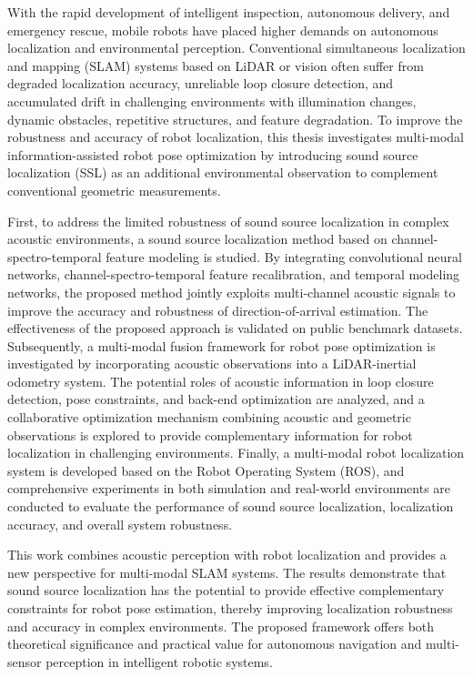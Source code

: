 \begin{abstract*}
With the rapid development of intelligent inspection, autonomous delivery, and 
emergency rescue, mobile robots have placed higher demands on autonomous 
localization and environmental perception. Conventional simultaneous localization 
and mapping (SLAM) systems based on LiDAR or vision often suffer from degraded 
localization accuracy, unreliable loop closure detection, and accumulated drift 
in challenging environments with illumination changes, dynamic obstacles, 
repetitive structures, and feature degradation. To improve the robustness and 
accuracy of robot localization, this thesis investigates multi-modal 
information-assisted robot pose optimization by introducing sound source 
localization (SSL) as an additional environmental observation to complement 
conventional geometric measurements.

First, to address the limited robustness of sound source localization in complex 
acoustic environments, a sound source localization method based on channel-spectro-temporal 
feature modeling is studied. By integrating convolutional neural networks, channel-spectro-temporal 
feature recalibration, and temporal modeling networks, the proposed method jointly exploits 
multi-channel acoustic signals to improve the accuracy and robustness of direction-of-arrival 
estimation. The effectiveness of the proposed approach is validated on public benchmark datasets. 
Subsequently, a multi-modal fusion framework for robot pose optimization is investigated by 
incorporating acoustic observations into a LiDAR-inertial odometry system. The potential roles of 
acoustic information in loop closure detection, pose constraints, and back-end optimization are 
analyzed, and a collaborative optimization mechanism combining acoustic and geometric observations 
is explored to provide complementary information for robot localization in challenging environments. 
Finally, a multi-modal robot localization system is developed based on the Robot Operating System 
(ROS), and comprehensive experiments in both simulation and real-world environments are conducted 
to evaluate the performance of sound source localization, localization accuracy, and overall system 
robustness.

This work combines acoustic perception with robot localization and provides a new perspective 
for multi-modal SLAM systems. The results demonstrate that sound source localization has the 
potential to provide effective complementary constraints for robot pose estimation, thereby 
improving localization robustness and accuracy in complex environments. The proposed framework 
offers both theoretical significance and practical value for autonomous navigation and 
multi-sensor perception in intelligent robotic systems.


\end{abstract*}
